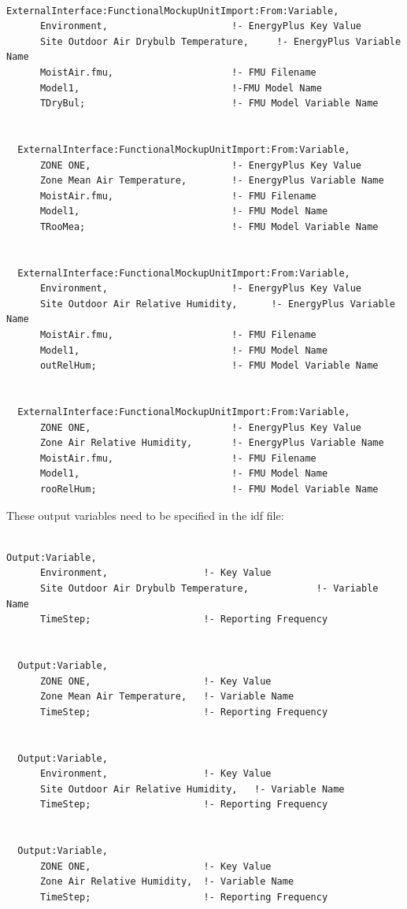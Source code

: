 \begin{lstlisting}

ExternalInterface:FunctionalMockupUnitImport:From:Variable,
      Environment,                      !- EnergyPlus Key Value
      Site Outdoor Air Drybulb Temperature,     !- EnergyPlus Variable Name
      MoistAir.fmu,                     !- FMU Filename
      Model1,                           !-FMU Model Name
      TDryBul;                          !- FMU Model Variable Name


  ExternalInterface:FunctionalMockupUnitImport:From:Variable,
      ZONE ONE,                         !- EnergyPlus Key Value
      Zone Mean Air Temperature,        !- EnergyPlus Variable Name
      MoistAir.fmu,                     !- FMU Filename
      Model1,                           !- FMU Model Name
      TRooMea;                          !- FMU Model Variable Name


  ExternalInterface:FunctionalMockupUnitImport:From:Variable,
      Environment,                      !- EnergyPlus Key Value
      Site Outdoor Air Relative Humidity,      !- EnergyPlus Variable Name
      MoistAir.fmu,                     !- FMU Filename
      Model1,                           !- FMU Model Name
      outRelHum;                        !- FMU Model Variable Name


  ExternalInterface:FunctionalMockupUnitImport:From:Variable,
      ZONE ONE,                         !- EnergyPlus Key Value
      Zone Air Relative Humidity,       !- EnergyPlus Variable Name
      MoistAir.fmu,                     !- FMU Filename
      Model1,                           !- FMU Model Name
      rooRelHum;                        !- FMU Model Variable Name
\end{lstlisting}

These output variables need to be specified in the idf file:

\begin{lstlisting}

Output:Variable,
      Environment,                 !- Key Value
      Site Outdoor Air Drybulb Temperature,            !- Variable Name
      TimeStep;                    !- Reporting Frequency


  Output:Variable,
      ZONE ONE,                    !- Key Value
      Zone Mean Air Temperature,   !- Variable Name
      TimeStep;                    !- Reporting Frequency


  Output:Variable,
      Environment,                 !- Key Value
      Site Outdoor Air Relative Humidity,   !- Variable Name
      TimeStep;                    !- Reporting Frequency


  Output:Variable,
      ZONE ONE,                    !- Key Value
      Zone Air Relative Humidity,  !- Variable Name
      TimeStep;                    !- Reporting Frequency
\end{lstlisting}

